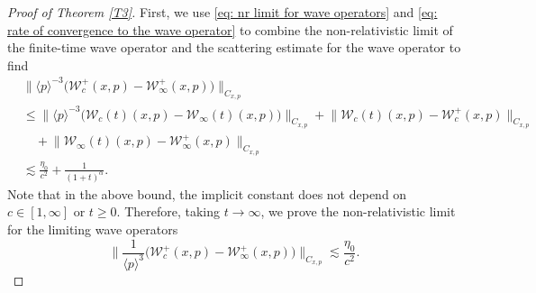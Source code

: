 \documentclass[reqno, 11pt, letterpaper]{amsart}
\theoremstyle{remark}
\numberwithin{equation}{section}
\numberwithin{theorem}{section}
\numberwithin{table}{section}
\numberwithin{figure}{section}
\begin{document}
\begin{proof}[Proof of Theorem \ref{T3}]
First, we use \eqref{eq: nr limit for wave operators} and \eqref{eq: rate of convergence to the wave operator} to combine the non-relativistic limit of the finite-time wave operator and the scattering estimate for the wave operator to find 
$$\begin{aligned}
&\big\|\langle p \rangle^{-3}\big(\mathcal{W}_c^+(x,p)-\mathcal{W}_\infty^+(x,p)\big)\big\|_{C_{x,p}}\\
&\leq \big\|\langle p \rangle^{-3}\big(\mathcal{W}_c(t)(x,p)-\mathcal{W}_\infty(t)(x,p)\big)\big\|_{C_{x,p}}+\big\|\mathcal{W}_c(t)(x,p)-\mathcal{W}_c^+(x,p)\big\|_{C_{x,p}}\\
&\quad+\big\|\mathcal{W}_\infty(t)(x,p)-\mathcal{W}_\infty^+(x,p)\big\|_{C_{x,p}}\\
&\lesssim \frac{\eta_0}{c^2}+\frac{1}{(1+t)^\alpha}.
\end{aligned}$$
Note that in the above bound, the implicit constant does not depend on $c \in [1,\infty]$ or $t\geq0$. Therefore, taking $t\to\infty$, we prove the non-relativistic limit for the limiting wave operators 
\begin{equation}\label{eq: non-relativistic limit of the infinite-time wave operator}
\Big\|\frac{1}{\langle p \rangle^3}\Big(\mathcal{W}_c^+(x,p)-\mathcal{W}_\infty^+(x,p)\Big)\Big\|_{C_{x,p}}\lesssim \frac{\eta_0}{c^2}.
\end{equation}


\end{proof}
\end{document}
